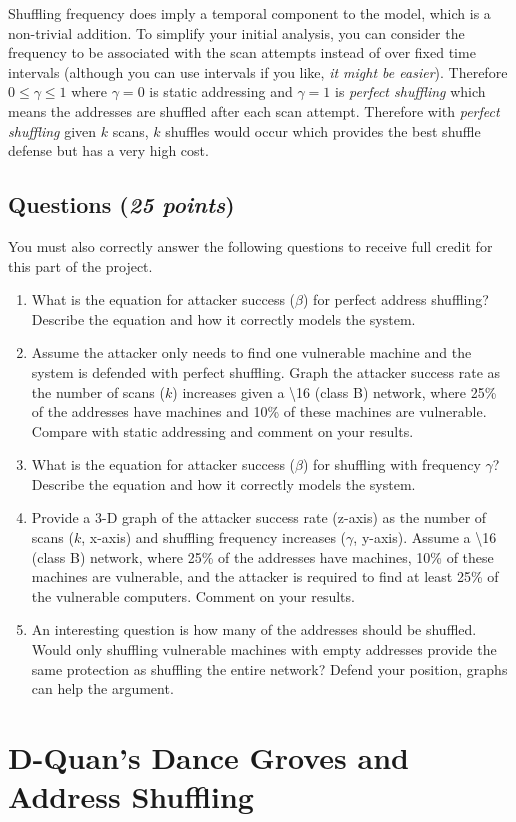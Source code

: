 \documentclass[10pt]{article}
\newcommand{\Questions}[1]{
\subsection*{Questions {\rm \normalsize (\textsf{\textit{#1 points}})}}
}
\begin{document}
Shuffling frequency does imply a temporal component to the model, which is a non-trivial addition. To simplify your initial analysis, you can consider the frequency to be associated with the scan attempts instead of over fixed time intervals (although you can use intervals if you like, \textit{it might be easier}). Therefore $0 \leq \gamma \leq 1$ where $\gamma = 0$ is static addressing and $\gamma = 1$ is \textit{perfect shuffling} which means the addresses are shuffled after each scan attempt. Therefore with \textit{perfect shuffling} given $k$ scans, $k$ shuffles would occur which provides the best shuffle defense but has a very high cost.

\Questions{25}
You must also correctly answer the following questions to receive full credit for this part of the project.
\begin{enumerate}
  \item What is the equation for attacker success ($\beta$) for perfect address shuffling? Describe the equation and how it correctly models the system.
  \item Assume the attacker only needs to find one vulnerable machine and the system is defended with perfect shuffling. Graph the attacker success rate as the number of scans ($k$) increases given a  \textbackslash 16 (class B) network, where 25\% of the addresses have machines and 10\% of these machines are vulnerable. Compare with static addressing and comment on your results.
  \item What is the equation for attacker success ($\beta$) for shuffling with frequency $\gamma$? Describe the equation and how it correctly models the system.
    \item Provide a 3-D graph of the attacker success rate (z-axis) as the number of scans ($k$, x-axis) and shuffling frequency increases ($\gamma$, y-axis). Assume a  \textbackslash 16 (class B) network, where 25\% of the addresses have machines, 10\% of these machines are vulnerable, and the attacker is required to find at least 25\% of the vulnerable computers. Comment on your results.
    \item An interesting question is how many of the addresses should be shuffled. Would only shuffling vulnerable machines with empty addresses provide the same protection as shuffling the entire network? Defend your position, graphs can help the argument.
\end{enumerate}

\section{D-Quan's Dance Groves and Address Shuffling}
\end{document}
